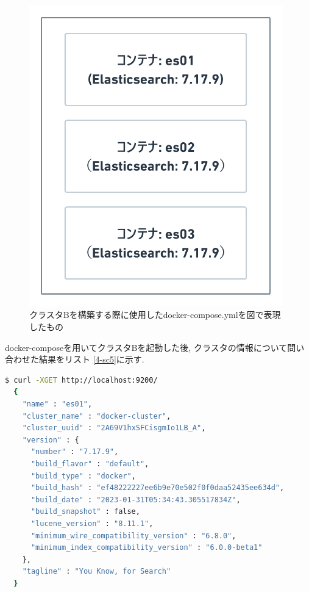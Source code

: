 \begin{figure}[H]
  \begin{center}
    \includegraphics[width=110mm]{sotu/figure/all-7.19.9.png}
    \caption{クラスタBを構築する際に使用したdocker-compose.ymlを図で表現したもの}
    \label{4-p10}
  \end{center}
\end{figure}

docker-composeを用いてクラスタBを起動した後, クラスタの情報について問い合わせた結果をリスト \ref{4-sc5}に示す.

\begin{lstlisting}[language=bash, caption=クラスタBの情報について問い合わせた結果, label=4-sc5, breaklines=false]
  $ curl -XGET http://localhost:9200/
  {
    "name" : "es01",
    "cluster_name" : "docker-cluster",
    "cluster_uuid" : "2A69V1hxSFCisgmIo1LB_A",
    "version" : {
      "number" : "7.17.9",
      "build_flavor" : "default",
      "build_type" : "docker",
      "build_hash" : "ef48222227ee6b9e70e502f0f0daa52435ee634d",
      "build_date" : "2023-01-31T05:34:43.305517834Z",
      "build_snapshot" : false,
      "lucene_version" : "8.11.1",
      "minimum_wire_compatibility_version" : "6.8.0",
      "minimum_index_compatibility_version" : "6.0.0-beta1"
    },
    "tagline" : "You Know, for Search"
  }
\end{lstlisting}

